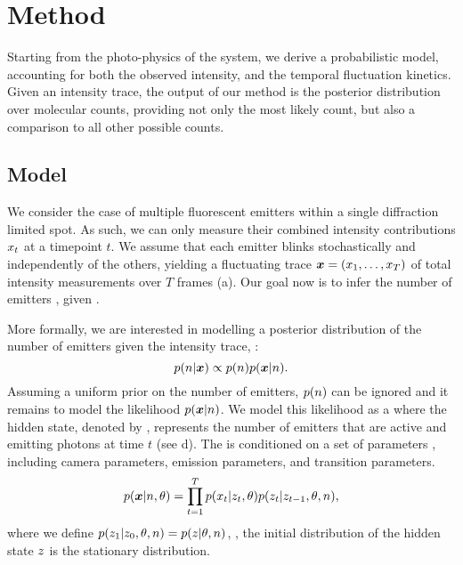 \section{Method}

Starting from the photo-physics of the system, we derive a probabilistic model,
accounting for both the observed intensity, and the temporal fluctuation
kinetics.
  Given an intensity trace, the output of our method \ours is the posterior
  distribution over molecular counts, providing not only the most likely count,
  but also a comparison to all other possible counts. 

\subsection{Model}

We consider the case of multiple fluorescent emitters within a single
diffraction limited spot.
%
  As such, we can only measure their combined intensity contributions
  $x_{t}$ at a timepoint $t$.
  We assume that each emitter blinks stochastically and independently of the
  others, yielding a fluctuating trace $\bm{x} = (x_{1},\ldots,x_{T})$ of total
  intensity measurements over $T$ frames (a).
  Our goal now is to infer the number of emitters \n, given \trace.

More formally, we are interested in modelling a posterior distribution of the
number of emitters given the intensity trace, \ie:
  \begin{equation*}
    p(n | \bm{x}) \propto p(n) p(\bm{x} | n)
    \text{.}
  \end{equation*}
  Assuming a uniform prior on the number of emitters, $p(n)$ can be ignored
  and it remains to model the likelihood $p(\bm{x}|n)$.
  We model this likelihood as a \hmm where the hidden state, denoted by ,
  represents the number of emitters that are active and emitting photons at
  time $t$ (see d).
  The \hmm is conditioned on a set of parameters \parameters, including
    \parametersc camera parameters, \parameterse emission parameters, 
    and \parameterst transition parameters.
  \begin{equation}
    p(\bm{x}| n, \theta) =
      \prod_{t=1}^{T}
        p(x_{t} | z_{t}, \theta)
        p(z_{t} | z_{t-1}, \theta, n)
    \text{,}
    \label{eq:method:HMM}
  \end{equation}
  where we define $p(z_{1}|z_{0},\theta,n)=p(z_{}|\theta,n)$, \ie,
  the initial distribution of the hidden state $z_{}$ is the stationary
  distribution.

